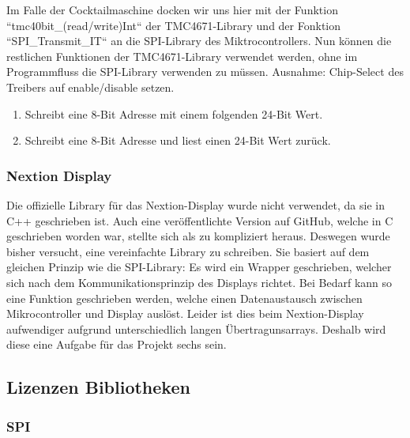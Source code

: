 Im Falle der Cocktailmaschine docken wir uns hier mit der Funktion ``tmc40bit\_(read/write)Int`` der TMC4671-Library und der Fonktion ``SPI\_Transmit\_IT`` an die SPI-Library des Miktrocontrollers. Nun können die restlichen Funktionen der TMC4671-Library verwendet werden, ohne im Programmfluss die SPI-Library verwenden zu müssen. Ausnahme: Chip-Select des Treibers auf enable/disable setzen.

\begin{enumerate}
\item Schreibt eine 8-Bit Adresse mit einem folgenden 24-Bit Wert.
\item Schreibt eine 8-Bit Adresse und liest einen 24-Bit Wert zurück.
\end{enumerate}

\subsubsection{Nextion Display}\label{subsubsection:Software_Nextion}

Die offizielle Library für das Nextion-Display wurde nicht verwendet, da sie in C++ geschrieben ist. Auch eine veröffentlichte Version auf GitHub, welche in C geschrieben worden war, stellte sich als zu kompliziert heraus. Deswegen wurde bisher versucht, eine vereinfachte Library zu schreiben. Sie basiert auf dem gleichen Prinzip wie die SPI-Library: Es wird ein Wrapper geschrieben, welcher sich nach dem Kommunikationsprinzip des Displays richtet. Bei Bedarf kann so eine Funktion geschrieben werden, welche einen Datenaustausch zwischen Mikrocontroller und Display auslöst. Leider ist dies beim Nextion-Display aufwendiger aufgrund unterschiedlich langen Übertragunsarrays. Deshalb wird diese eine Aufgabe für das Projekt sechs sein.

\subsection{Lizenzen Bibliotheken}\label{subsec:Software_Lizenzen}


\subsubsection{SPI}\label{subsubsec:Software_Lizenzen_SPI}

